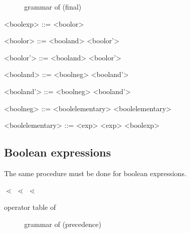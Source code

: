 \begin{figure}
	\centering
	
	
	
	\caption{grammar of  (final)}
	\label{fig:grammar_core_exp_final}
\end{figure}

\begin{grammarEx}
	<bool\textunderscore exp> ::= <bool\textunderscore or> 
	
	<bool\textunderscore or> ::= <bool\textunderscore and> <bool\textunderscore or'> 
	
	<bool\textunderscore or'> ::= \lit{\textbar\textbar} <bool\textunderscore and> <bool\textunderscore or'> 
	\alt \lit{\textepsilon{}} 
	
	<bool\textunderscore and> ::= <bool\textunderscore neg> <bool\textunderscore and'> 
	
	<bool\textunderscore and'> ::= \lit{\&\&} <bool\textunderscore neg> <bool\textunderscore and'> 
	\alt \lit{\textepsilon{}} 
	
	<bool\textunderscore neg> ::= <bool\textunderscore elementary> 
	\alt \lit{~} <bool\textunderscore elementary> 
	
	<bool\textunderscore elementary> ::= <exp> \lit{\textless{}} <exp> 
	\alt {} 
	\alt \lit{[} <bool\textunderscore exp> \lit{]}
\end{grammarEx}

\subsection{Boolean expressions}

The same procedure must be done for boolean expressions.

\textterminal{\textbar{}\textbar{}} $\lessdot{}$ \textterminal{\&\&} $\lessdot{}$ \textterminal{$\neg{}$} $\lessdot{}$ 

\begin{table}
	\centering
	\caption{operator table of }
	\label{tab:exp_prec}

	
\end{table}

\begin{figure}
	\centering
	
	

	\caption{grammar of  (precedence)}
	\label{fig:grammar_core_bool_exp_prec}
\end{figure}

